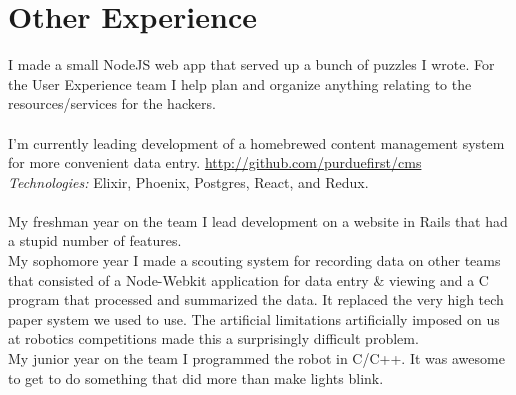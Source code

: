 \documentclass[11pt,letter,sans]{moderncv}
\begin{document}
\section{Other Experience}
I made a small NodeJS web app that served up a bunch of puzzles I wrote.
For the User Experience team I help plan and organize anything relating to the resources/services for the hackers.
\\
\\
I'm currently leading development of a homebrewed content management system for more convenient data entry. \url{http://github.com/purduefirst/cms}
\\
\textit{Technologies:} Elixir, Phoenix, Postgres, React, and Redux.
\\
\\
My freshman year on the team I lead development on a website in Rails that had a stupid number of features.
\\
My sophomore year I made a scouting system for recording data on other teams that consisted of a Node-Webkit application for data entry \& viewing and a C program that processed and summarized the data.
It replaced the very high tech paper system we used to use.
The artificial limitations artificially imposed on us at robotics competitions made this a surprisingly difficult problem.
\\
My junior year on the team I programmed the robot in C/C++.
It was awesome to get to do something that did more than make lights blink.
\end{document}
